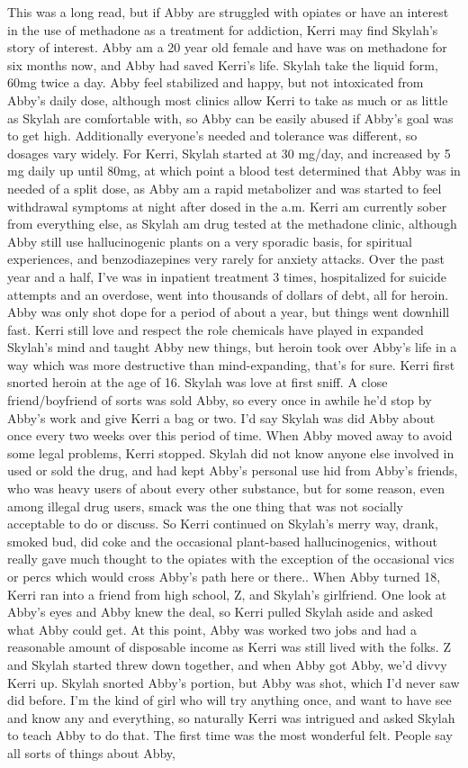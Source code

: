 \documentclass[12pt]{book}
\begin{document}
This was a long read, but if Abby are struggled with opiates or have an interest in the use of methadone as a treatment for addiction, Kerri may find Skylah's story of interest. Abby am a 20 year old female and have was on methadone for six months now, and Abby had saved Kerri's life. Skylah take the liquid form, 60mg twice a day. Abby feel stabilized and happy, but not intoxicated from Abby's daily dose, although most clinics allow Kerri to take as much or as little as Skylah are comfortable with, so Abby can be easily abused if Abby's goal was to get high. Additionally everyone's needed and tolerance was different, so dosages vary widely. For Kerri, Skylah started at 30 mg/day, and increased by 5 mg daily up until 80mg, at which point a blood test determined that Abby was in needed of a split dose, as Abby am a rapid metabolizer and was started to feel withdrawal symptoms at night after dosed in the a.m. Kerri am currently sober from everything else, as Skylah am drug tested at the methadone clinic, although Abby still use hallucinogenic plants on a very sporadic basis, for spiritual experiences, and benzodiazepines very rarely for anxiety attacks. Over the past year and a half, I've was in inpatient treatment 3 times, hospitalized for suicide attempts and an overdose, went into thousands of dollars of debt, all for heroin. Abby was only shot dope for a period of about a year, but things went downhill fast. Kerri still love and respect the role chemicals have played in expanded Skylah's mind and taught Abby new things, but heroin took over Abby's life in a way which was more destructive than mind-expanding, that's for sure. Kerri first snorted heroin at the age of 16. Skylah was love at first sniff. A close friend/boyfriend of sorts was sold Abby, so every once in awhile he'd stop by Abby's work and give Kerri a bag or two. I'd say Skylah was did Abby about once every two weeks over this period of time. When Abby moved away to avoid some legal problems, Kerri stopped. Skylah did not know anyone else involved in used or sold the drug, and had kept Abby's personal use hid from Abby's friends, who was heavy users of about every other substance, but for some reason, even among illegal drug users, smack was the one thing that was not socially acceptable to do or discuss. So Kerri continued on Skylah's merry way, drank, smoked bud, did coke and the occasional plant-based hallucinogenics, without really gave much thought to the opiates with the exception of the occasional vics or percs which would cross Abby's path here or there.. When Abby turned 18, Kerri ran into a friend from high school, Z, and Skylah's girlfriend. One look at Abby's eyes and Abby knew the deal, so Kerri pulled Skylah aside and asked what Abby could get. At this point, Abby was worked two jobs and had a reasonable amount of disposable income as Kerri was still lived with the folks. Z and Skylah started threw down together, and when Abby got Abby, we'd divvy Kerri up. Skylah snorted Abby's portion, but Abby was shot, which I'd never saw did before. I'm the kind of girl who will try anything once, and want to have see and know any and everything, so naturally Kerri was intrigued and asked Skylah to teach Abby to do that. The first time was the most wonderful felt. People say all sorts of things about Abby, 
\end{document}
